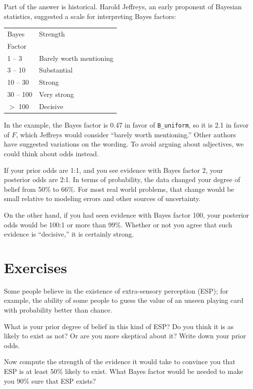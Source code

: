 \documentclass[12pt]{book}
\begin{document}
Part of the answer is historical.  Harold Jeffreys, an early
proponent of Bayesian statistics, suggested a scale for
interpreting Bayes factors:

\begin{tabular}{|l|l|}
\hline
Bayes & Strength \\
Factor & \\
\hline
1 -- 3 & Barely worth mentioning \\
3 -- 10 & Substantial \\
10 -- 30 & Strong \\
30 -- 100 & Very strong \\
$>$ 100 & Decisive \\
\hline
\end{tabular}

In the example, the Bayes factor is 0.47 in favor of \verb"B_uniform",
so it is 2.1 in favor of $F$, which Jeffreys would consider ``barely
worth mentioning.''  Other authors have suggested variations on the
wording.  To avoid arguing about adjectives, we could think about odds
instead.

If your prior odds are 1:1, and you see evidence with Bayes
factor 2, your posterior odds are 2:1.  In terms of probability,
the data changed your degree of belief from 50\% to 66\%.  For
most real world problems, that change would be small relative
to modeling errors and other sources of uncertainty.

On the other hand, if you had seen evidence with Bayes
factor 100, your posterior odds would be 100:1 or more than 99\%.
Whether or not you agree that such evidence is ``decisive,''
it is certainly strong.

\section{Exercises}

\begin{exercise}
Some people believe in the existence of extra-sensory
perception (ESP); for example, the ability of some people to guess
the value of an unseen playing card with probability better
than chance.

What is your prior degree of belief in this kind of ESP?
Do you think it is as likely to exist as not?  Or are you
more skeptical about it?  Write down your prior odds.

Now compute the strength of the evidence it would take to
convince you that ESP is at least 50\% likely to exist.
What Bayes factor would be needed to make you 90\% sure
that ESP exists?
\end{exercise}
\end{document}
